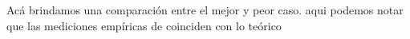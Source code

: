 Acá brindamos una comparación entre el mejor y  peor caso. aqui podemos notar que las mediciones empíricas de coinciden con lo teórico











